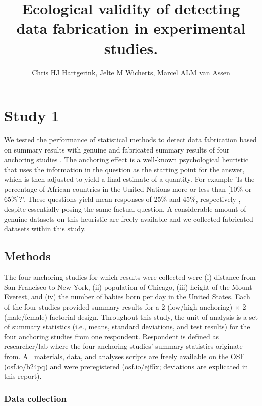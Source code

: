 \documentclass{article}
\title{Ecological validity of detecting data fabrication in experimental studies.}
\author{Chris HJ Hartgerink, Jelte M Wicherts, Marcel ALM van Assen}
\begin{document}

\maketitle


\section*{Study 1}


We tested the performance of statistical methods to detect data fabrication based on summary results with genuine and fabricated summary results of four anchoring studies \citep{tversky1974,jacowitz1995}. The anchoring effect is a well-known psychological heuristic that uses the information in the question as the starting point for the answer, which is then adjusted to yield a final estimate of a quantity. For example 'Is the percentage of African countries in the United Nations more or less than [10\% or 65\%]?'. These questions yield mean responses of 25\% and 45\%, respectively \citep{tversky1974}, despite essentially posing the same factual question. A considerable amount of genuine datasets on this heuristic are freely available and we collected fabricated datasets within this study.

\subsection*{Methods}

The four anchoring studies for which results were collected were (i) distance from San Francisco to New York, (ii) population of Chicago, (iii) height of the Mount Everest, and (iv) the number of babies born per day in the United States. Each of the four studies provided summary results for a 2 (low/high anchoring) $\times$ 2 (male/female) factorial design. Throughout this study, the unit of analysis is a set of summary statistics (i.e., means, standard deviations, and test results) for the four anchoring studies from one respondent. Respondent is defined as researcher/lab where the four anchoring studies' summary statistics originate from. All materials, data, and analyses scripts are freely available on the OSF (\url{osf.io/b24pq}) and were preregistered (\url{osf.io/ejf5x}; deviations are explicated in this report). 

\subsubsection*{Data collection}
\end{document}
